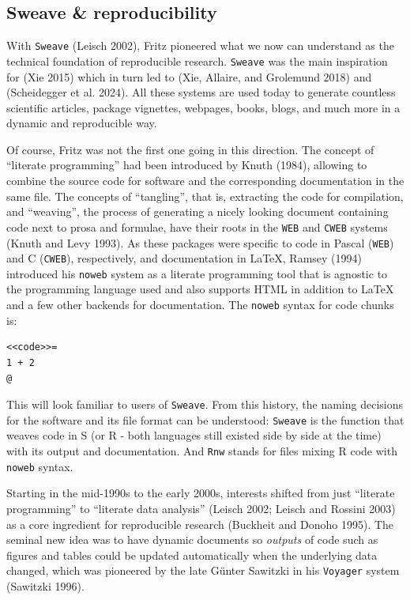 \hypertarget{sweave-reproducibility}{%
\subsection{Sweave \& reproducibility}\label{sweave-reproducibility}}

With \texttt{Sweave} (Leisch 2002), Fritz pioneered what we now can understand as
the technical foundation of reproducible research. \texttt{Sweave} was the main
inspiration for  (Xie 2015) which in turn led to
 (Xie, Allaire, and Grolemund 2018) and 
(Scheidegger et al. 2024). All these systems are used today to
generate countless scientific articles, package vignettes, webpages, books, blogs,
and much more in a dynamic and reproducible way.

Of course, Fritz was not the first one going in this direction. The concept
of ``literate programming'' had been introduced by Knuth (1984), allowing to
combine the source code for software and the corresponding documentation
in the same file. The concepts of ``tangling'', that is, extracting the code
for compilation, and ``weaving'', the process of generating a nicely looking
document containing code next to prosa and formulae, have their roots in the
\texttt{WEB} and \texttt{CWEB} systems (Knuth and Levy 1993). As these packages were specific
to code in Pascal (\texttt{WEB}) and C (\texttt{CWEB}), respectively, and documentation in
LaTeX, Ramsey (1994) introduced his \texttt{noweb} system as a literate programming
tool that is agnostic to the programming language used and also supports HTML
in addition to LaTeX and a few other backends for documentation. The \texttt{noweb}
syntax for code chunks is:

\pagebreak

\begin{verbatim}
<<code>>=
1 + 2
@
\end{verbatim}

This will look familiar to users of \texttt{Sweave}. From this history, the naming
decisions for the software and its file format can be understood: \texttt{Sweave}
is the function that weaves code in S (or R - both languages still existed
side by side at the time) with its output and documentation. And \texttt{Rnw} stands for files
mixing R code with \texttt{noweb} syntax.

Starting in the mid-1990s to the early 2000s, interests shifted from just
``literate programming'' to ``literate data analysis'' (Leisch 2002; Leisch and Rossini 2003)
as a core ingredient for reproducible research (Buckheit and Donoho 1995).
The seminal new idea was to have dynamic documents so \emph{outputs} of code
such as figures and tables could be updated automatically when the underlying
data changed, which was pioneered by the late Günter Sawitzki in his
\texttt{Voyager} system (Sawitzki 1996).

